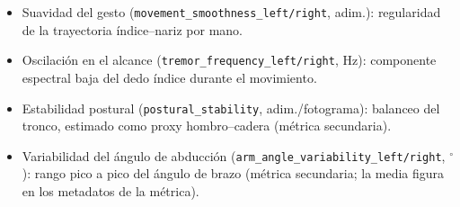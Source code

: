 \begin{sloppypar}
\begin{itemize}
\begin{itemize}
        \item Suavidad del gesto (\texttt{movement\_\allowbreak{}smoothness\_\allowbreak{}left/\allowbreak{}right}, adim.): regularidad de la trayectoria índice--nariz por mano.
        \item Oscilación en el alcance (\texttt{tremor\_\allowbreak{}frequency\_\allowbreak{}left/\allowbreak{}right}, Hz): componente espectral baja del dedo índice durante el movimiento.
        \item Estabilidad postural (\texttt{postural\_\allowbreak{}stability}, adim./fotograma): balanceo del tronco, estimado como proxy hombro--cadera (métrica secundaria).
        \item Variabilidad del ángulo de abducción (\texttt{arm\_\allowbreak{}angle\_\allowbreak{}variability\_\allowbreak{}left/\allowbreak{}right}, $^{\circ}$): rango pico a pico del ángulo de brazo (métrica secundaria; la media figura en los metadatos de la métrica).
    \end{itemize}


\end{itemize}
\end{sloppypar}
